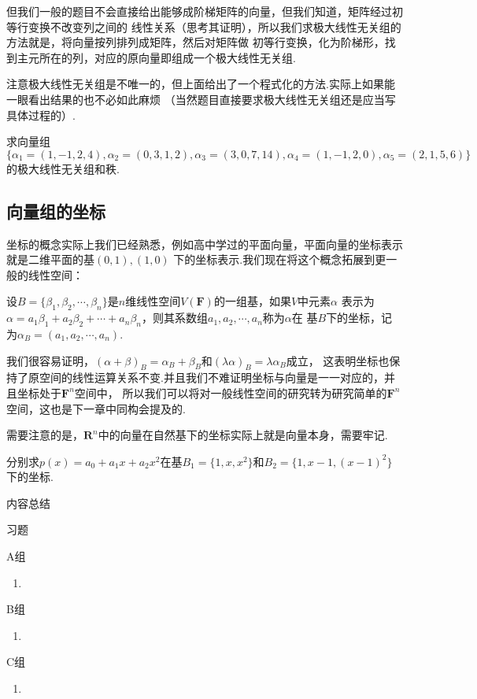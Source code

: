 但我们一般的题目不会直接给出能够成阶梯矩阵的向量，但我们知道，矩阵经过初等行变换不改变列之间的
线性关系（思考其证明），所以我们求极大线性无关组的方法就是，将向量按列排列成矩阵，然后对矩阵做
初等行变换，化为阶梯形，找到主元所在的列，对应的原向量即组成一个极大线性无关组.

注意极大线性无关组是不唯一的，但上面给出了一个程式化的方法.实际上如果能一眼看出结果的也不必如此麻烦
（当然题目直接要求极大线性无关组还是应当写具体过程的）.
\begin{example}
	求向量组$\{\alpha_1=(1,-1,2,4),\alpha_2=(0,3,1,2),\alpha_3=(3,0,7,14),\alpha_4=(1,-1,2,0),\alpha_5=(2,1,5,6)\}$
	的极大线性无关组和秩.
\end{example}

\subsection{向量组的坐标}
坐标的概念实际上我们已经熟悉，例如高中学过的平面向量，平面向量的坐标表示就是二维平面的基$(0,1),(1,0)$
下的坐标表示.我们现在将这个概念拓展到更一般的线性空间：
\begin{definition}
	设$B=\{\beta_1,\beta_2,\cdots,\beta_n\}$是$n$维线性空间$V(\mathbf{F})$的一组基，如果$V$中元素$\alpha$
	表示为$\alpha=a_1\beta_1+a_2\beta_2+\cdots+a_n\beta_n$，则其系数组$a_1,a_2,\cdots,a_n$称为$\alpha$在
	基$B$下的坐标，记为$\alpha_B=(a_1,a_2,\cdots,a_n)$.
\end{definition}
我们很容易证明，$(\alpha+\beta)_B=\alpha_B+\beta_B$和$(\lambda\alpha)_B=\lambda\alpha_B$成立，
这表明坐标也保持了原空间的线性运算关系不变.并且我们不难证明坐标与向量是一一对应的，并且坐标处于$\mathbf{F}^n$空间中，
所以我们可以将对一般线性空间的研究转为研究简单的$\mathbf{F}^n$空间，这也是下一章中同构会提及的.

需要注意的是，$\mathbf{R}^n$中的向量在自然基下的坐标实际上就是向量本身，需要牢记.
\begin{example}
	分别求$p(x)=a_0+a_1x+a_2x^2$在基$B_1=\{1,x,x^2\}$和$B_2=\{1,x-1,(x-1)^2\}$下的坐标.
\end{example}

\vspace{2ex}
\centerline{\heiti \Large 内容总结}

\vspace{2ex}

\centerline{\heiti \Large 习题}
\vspace{2ex}
{\kaishu }
\begin{flushright}
	\kaishu

\end{flushright}
\centerline{\heiti A组}
\begin{enumerate}
	\item
\end{enumerate}
\centerline{\heiti B组}
\begin{enumerate}
	\item
\end{enumerate}
\centerline{\heiti C组}
\begin{enumerate}
	\item
\end{enumerate}